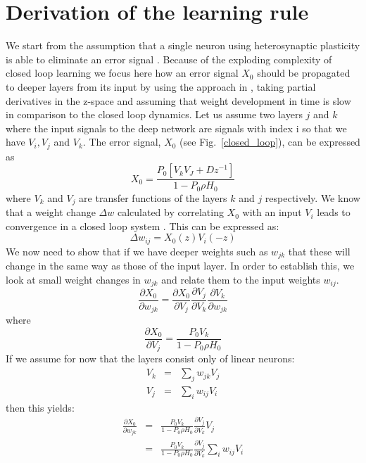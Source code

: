\documentclass{article}
\begin{document}
\section{Derivation of the learning rule}
We start from the assumption that a single neuron using heterosynaptic
plasticity is able to eliminate an error signal
\cite{Porr2006ICO}. Because of the exploding complexity of closed loop
learning we focus here how an error signal $X_0$ should be propagated
to deeper layers from its input by using the approach in
\cite{Mehta1986}, taking partial derivatives in the z-space and
assuming that weight development in time is slow in comparison to the
closed loop dynamics.  Let us assume two layers $j$ and $k$ where the
input signals to the deep network are signals with index i so that we
have $V_i, V_j$ and $V_k$. The error signal, $X_0$ (see
Fig.~\ref{closed_loop}), can be expressed as
\begin{equation}
  X_0 = \frac{P_0 \left[ V_k V_J + D z^{-1} \right]}{1-P_0 \rho H_0}
\end{equation}
where $V_k$ and $V_j$ are transfer functions of the layers $k$ and $j$
respectively. We know that a weight change $\Delta w$ calculated by
correlating $X_0$ with an input $V_i$ leads to convergence in a closed
loop system \cite{Porr2006ICO}. This can be expressed as:
\begin{equation}
  \Delta w_{ij} = X_0(z) V_i(-z)
\end{equation}
We now need to show that if we have deeper weights such as $w_{jk}$
that these will change in the same way as those of the input layer. In
order to establish this, we look at small weight changes in $w_{jk}$
and relate them to the input weights $w_{ij}$.
\begin{equation}
    \frac{\partial X_0}{\partial w_{jk}} =
    \frac{\partial X_0}{\partial V_j}
    \frac{\partial V_j}{\partial V_k}
    \frac{\partial V_k}{\partial w_{jk}}
\end{equation}    
where
\begin{equation}
\frac{\partial X_0}{\partial V_j} = \frac{P_0 V_k}{1-P_0 \rho H_0}
\end{equation}
If we assume for now that the layers consist only of linear neurons:
\begin{eqnarray}
  V_k &=& \sum_j w_{jk} V_j \\
  V_j &=& \sum_i w_{ij} V_i
\end{eqnarray}
then this yields:
\begin{eqnarray}
    \frac{\partial X_0}{\partial w_{jk}} &=&
    \frac{P_0 V_k}{1-P_0 \rho H_0}
    \frac{\partial V_j}{\partial V_k}
    V_j \\
                                        &=&
    \frac{P_0 V_k}{1-P_0 \rho H_0}
    \frac{\partial V_j}{\partial V_k}
    \sum_i w_{ij} V_i
\end{eqnarray}    
\end{document}
